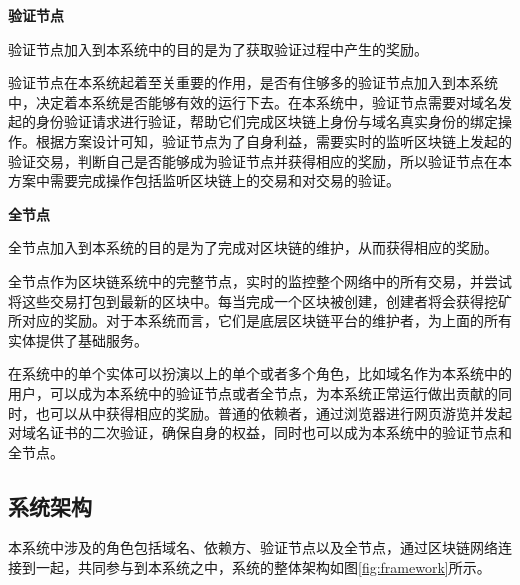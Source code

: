 \noindent\textbf{验证节点}

验证节点加入到本系统中的目的是为了获取验证过程中产生的奖励。

验证节点在本系统起着至关重要的作用，是否有住够多的验证节点加入到本系统中，决定着本系统是否能够有效的运行下去。在本系统中，验证节点需要对域名发起的身份验证请求进行验证，帮助它们完成区块链上身份与域名真实身份的绑定操作。根据方案设计可知，验证节点为了自身利益，需要实时的监听区块链上发起的验证交易，判断自己是否能够成为验证节点并获得相应的奖励，所以验证节点在本方案中需要完成操作包括监听区块链上的交易和对交易的验证。

\noindent\textbf{全节点}

全节点加入到本系统的目的是为了完成对区块链的维护，从而获得相应的奖励。

全节点作为区块链系统中的完整节点，实时的监控整个网络中的所有交易，并尝试将这些交易打包到最新的区块中。每当完成一个区块被创建，创建者将会获得挖矿所对应的奖励。对于本系统而言，它们是底层区块链平台的维护者，为上面的所有实体提供了基础服务。


在系统中的单个实体可以扮演以上的单个或者多个角色，比如域名作为本系统中的用户，可以成为本系统中的验证节点或者全节点，为本系统正常运行做出贡献的同时，也可以从中获得相应的奖励。普通的依赖者，通过浏览器进行网页游览并发起对域名证书的二次验证，确保自身的权益，同时也可以成为本系统中的验证节点和全节点。



\subsection{系统架构}


本系统中涉及的角色包括域名、依赖方、验证节点以及全节点，通过区块链网络连接到一起，共同参与到本系统之中，系统的整体架构如图\ref{fig:framework}所示。




